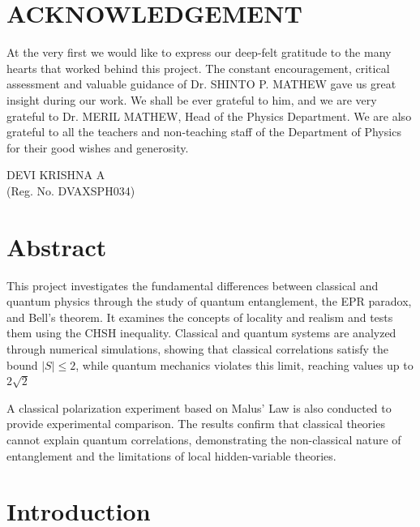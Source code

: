 \documentclass[14pt,a4paper]{extarticle}
\begin{document}
\section*{\centering ACKNOWLEDGEMENT}
\justifying

At the very first we would like to express our deep-felt gratitude to the many hearts that worked behind this project. The constant encouragement, critical assessment and valuable guidance of Dr. SHINTO P. MATHEW gave us great insight during our work. We shall be ever grateful to him, and we are very grateful to Dr. MERIL MATHEW, Head of the Physics Department. We are also grateful to all the teachers and non-teaching staff of the Department of Physics for their good wishes and generosity.

\vspace{2cm}

\begin{flushright}
DEVI KRISHNA A\\
(Reg. No. DVAXSPH034)
\end{flushright}
\vspace*{\fill}
\newpage

\vspace*{\fill}
\section*{\centering Abstract}
\vspace{1em}
    This project investigates the fundamental differences between classical and quantum physics through the study of quantum entanglement, the EPR paradox, and Bell’s theorem. It examines the concepts of locality and realism and tests them using the CHSH inequality. Classical and quantum systems are analyzed through numerical simulations, showing that classical correlations satisfy the bound ${|S|\leq2}$, while quantum mechanics violates this limit, reaching values up to $2\sqrt{2}$

    A classical polarization experiment based on Malus’ Law is also conducted to provide experimental comparison. The results confirm that classical theories cannot explain quantum correlations, demonstrating the non-classical nature of entanglement and the limitations of local hidden-variable theories.

\vspace*{\fill}

\newpage
\tableofcontents
\newpage
\pagestyle{plain}
\section{Introduction}
\end{document}
